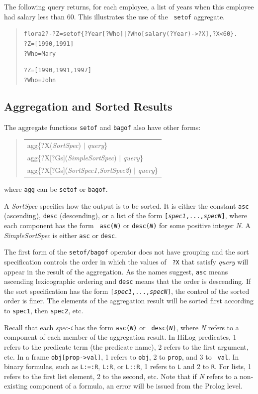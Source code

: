 \documentclass[11pt]{article}
\newcommand{\prompt}{flora2 ?- }
\newenvironment{qrules}{\begin{quote}\tt\begin{tabular}[t]{l}}%
{\end{tabular}\end{quote}}
\begin{document}
The following query returns, for each employee, a list of years when this
employee had salary less than 60. This illustrates the use of the {\tt
  setof} aggregate.
\begin{quote}
\begin{alltt}
\prompt ?Z = setof\{?Year[?Who]|?Who[salary(?Year)->?X], ?X < 60\}.
?Z = [1990,1991]
?Who = Mary

?Z = [1990,1991,1997]
?Who = John
\end{alltt}
\end{quote}

\subsection {Aggregation and Sorted Results}

The aggregate functions {\tt setof} and {\tt bagof}
also have other forms:  
\begin{qrules}
agg\{?X({\it SortSpec}) $|$ {\it query}\}\\
agg\{?X[?Gs]({\it SimpleSortSpec}) $|$ {\it query}\}\\
agg\{?X[?Gs]({\it SortSpec1,SortSpec2}) $|$ {\it query}\}
\end{qrules}
where {\tt agg} can be {\tt setof} or {\tt bagof}.

A {\it SortSpec} specifies how the output is to be sorted. It is either the
constant {\tt asc} (ascending), {\tt desc} (descending), or a list of the
form {\tt [{\it spec1},...,{\it specN}]}, where each component has the form {\tt
  asc({\it N})} or {\tt desc({\it N})} for some positive integer {\it N}.      
A {\it SimpleSortSpec} is either {\tt asc} or {\tt desc}.   

The first form of the {\tt setof/bagof} operator does not have grouping 
and the sort specification controls the order in which the values of {\tt
  ?X} that satisfy {\it query} will appear in the result of the aggregation.
As the names suggest, {\tt asc} means ascending
lexicographic ordering and {\tt desc} means that the order is descending.  
If the sort specification has the form {\tt [{\it spec1},...,{\it specN}]},
the control of the sorted order is finer. The elements of the aggregation
result will be sorted first according to {\tt spec1}, then {\tt spec2}, etc.

Recall that each \emph{spec-i}  has the form {\tt asc({\it N})} or {\tt
  desc({\it N})}, where \emph{N} refers to a component of each
member of the aggregation result. In HiLog predicates, 1 refers to the predicate term
(the predicate name), 2 refers to the first argument, etc. In a frame
{\tt obj[prop->val]}, 1 refers to {\tt obj}, 2 to {\tt prop}, and 3 to {\tt
  val}. In binary formulas, such as {\tt L:=:R}, {\tt L:R}, or {\tt L::R},
1 refers to {\tt L} and 2 to {\tt R}.  
For lists, 1 refers to the first list element, 2 to the second, etc.
Note that if {\it N} refers to a non-existing component of a formula, an
error will be issued from the Prolog level.
\end{document}
